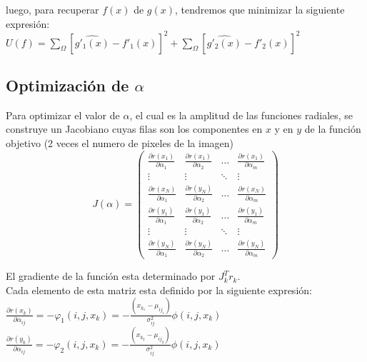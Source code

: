 \documentclass[10pt,journal,compsoc]{styles/IEEEtran}
\begin{document}
luego, para recuperar $f(x)$ de $g(x)$, tendremos que minimizar la siguiente expresión:\\

$U(f)=\sum \limits_{\Omega} [\widehat{g'_1(x)}-f'_1(x)]^2+\sum \limits_{\Omega} [\widehat{g'_2(x)}-f'_2(x)]^2$\\

\subsection{Optimización de $\alpha$}

Para optimizar el valor de $\alpha$, el cual es la amplitud de las funciones radiales, se construye un Jacobiano cuyas filas son los componentes en $x$ y en $y$ de la función objetivo (2 veces el numero de pixeles de la imagen)\\

\[J(\alpha)= \left( \begin{array}{cccc}
\frac{\partial r(x_1)}{\partial \alpha_1} & \frac{\partial r(x_1)}{\partial \alpha_2} & \ldots & \frac{\partial r(x_1)}{\partial \alpha_m} \\
\vdots & \vdots & \ddots & \vdots \\
\frac{\partial r(x_N)}{\partial \alpha_1} & \frac{\partial r(y_N)}{\partial \alpha_2} & \ldots & \frac{\partial r(x_N)}{\partial \alpha_m} \\
\frac{\partial r(y_1)}{\partial \alpha_1} & \frac{\partial r(y_1)}{\partial \alpha_2} & \ldots & \frac{\partial r(y_1)}{\partial \alpha_m} \\
\vdots & \vdots & \ddots & \vdots \\
\frac{\partial r(y_N)}{\partial \alpha_1} & \frac{\partial r(y_N)}{\partial \alpha_2} & \ldots & \frac{\partial r(y_N)}{\partial \alpha_m} 
\end{array} \right)\] 

El gradiente de la función esta determinado por $J_k^Tr_k$.\\

Cada elemento de esta matriz esta definido por la siguiente expresión:\\

$\frac{\partial r(x_k)}{\partial \alpha_{ij}}=-\varphi_1(i,j,x_k)=-\frac{(x_{k_1}-\mu_{ij_1})}{\sigma_{ij}^2}\phi(i,j,x_k)$\\

$\frac{\partial r(y_k)}{\partial \alpha_{ij}}=-\varphi_2(i,j,x_k)=-\frac{(x_{k_2}-\mu_{ij_2})}{\sigma_{ij}^2}\phi(i,j,x_k)$\\
\end{document}
